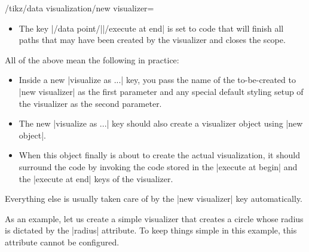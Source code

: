 \begin{key}{/tikz/data visualization/new visualizer=}
\begin{itemize}
\begin{enumerate}
                \item The  passed to the |new visualizer| key.
                \item The |every visualizer| style.
                \item The styling from the currently active style sheets, see
                    Section~\ref{section-dv-style-sheets}.
                \item The styling stored in the |styling| key mentioned above.
            \end{enumerate}
        \item The key |/data point/||/execute at end| is set to code
            that will finish all paths that may have been created by the
            visualizer and closes the scope.
    \end{itemize}

    All of the above mean the following in practice:
    \begin{itemize}
        \item Inside a new |visualize as ...| key, you pass the name of the
            to-be-created to |new visualizer| as the first parameter and any
            special default styling setup of the visualizer as the second
            parameter.
        \item The new |visualize as ...| key should also create a visualizer
            object using |new object|.
        \item When this object finally is about to create the actual
            visualization, it should surround the code by invoking the code
            stored in the |execute at begin| and the |execute at end| keys of
            the visualizer.
    \end{itemize}

    Everything else is usually taken care of by the |new visualizer| key
    automatically.
\end{key}

As an example, let us create a simple visualizer that creates a circle whose
radius is dictated by the |radius| attribute. To keep things simple in this
example, this attribute cannot be configured.

